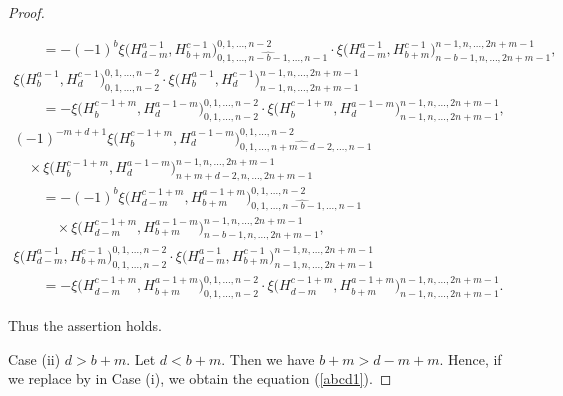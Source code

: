 \documentclass[pdftex]{sigma}
\numberwithin{equation}{section}
\begin{document}
\begin{proof}
\begin{itemize}
\begin{gather*}
\qquad{}=-{(-1)}^{b}\xi\bigl(H^{a-1}_{d-m}, H^{c-1}_{b+m}\bigr)^{0,1,\dots,n-2}_{0,1,\dots,\widehat{n-b-1},\dots,n-1}\cdot \xi\bigl(H^{a-1}_{d-m}, H^{c-1}_{b+m}\bigr)^{n-1,n,\dots,2n+m-1}_{n-b-1,n,\dots,2n+m-1},\\
\xi\bigl(H^{a-1}_{b}, H^{c-1}_{d}\bigr)^{0,1,\dots,n-2}_{0,1,\dots,n-2}\cdot\xi\bigl(H^{a-1}_{b}, H^{c-1}_{d}\bigr)^{n-1,n,\dots,2n+m-1}_{n-1,n,\dots,2n+m-1}\\
\qquad{}=-\xi\bigl(H^{c-1+m}_{b}, H^{a-1-m}_{d}\bigr)^{0,1,\dots,n-2}_{0,1,\dots,n-2}\cdot\xi\bigl(H^{c-1+m}_{b}, H^{a-1-m}_{d}\bigr)^{n-1,n,\dots,2n+m-1}_{n-1,n,\dots,2n+m-1},\\
{(-1)}^{-m+d+1}\xi\bigl(H^{c-1+m}_{b}, H^{a-1-m}_{d}\bigr)^{0,1,\dots,n-2}_{0,1,\dots,\widehat{n+m-d-2},\dots,n-1}\\
\quad{}\times \xi\bigl(H^{c-1+m}_{b}, H^{a-1-m}_{d}\bigr)^{n-1,n,\dots,2n+m-1}_{n+m+d-2,n,\dots,2n+m-1}\\
\qquad{}=-{(-1)}^{b}\xi\bigl(H^{c-1+m}_{d-m}, H^{a-1+m}_{b+m}\bigr)^{0,1,\dots,n-2}_{0,1,\dots,\widehat{n-b-1},\dots,n-1}\\
\qquad\quad{}\times \xi\bigl(H^{c-1+m}_{d-m}, H^{a-1-m}_{b+m}\bigr)^{n-1,n,\dots,2n+m-1}_{n-b-1,n,\dots,2n+m-1},\\
\xi\bigl(H^{a-1}_{d-m}, H^{c-1}_{b+m}\bigr)^{0,1,\dots,n-2}_{0,1,\dots,n-2}\cdot\xi\bigl(H^{a-1}_{d-m}, H^{c-1}_{b+m}\bigr)^{n-1,n,\dots,2n+m-1}_{n-1,n,\dots,2n+m-1}\\
\qquad{}=-\xi\bigl(H^{c-1+m}_{d-m}, H^{a-1+m}_{b+m}\bigr)^{0,1,\dots,n-2}_{0,1,\dots,n-2}\cdot\xi\bigl(H^{c-1+m}_{d-m}, H^{a-1+m}_{b+m}\bigr)^{n-1,n,\dots,2n+m-1}_{n-1,n,\dots,2n+m-1}.
\end{gather*}
\end{itemize}
Thus the assertion holds.

Case (ii) $d>b+m$.
Let $d<b+m$. Then we have $b+m>d-m+m$. Hence, if we replace  by  in Case (i), we obtain the equation (\ref{abcd1}).


\end{proof}
\end{document}
